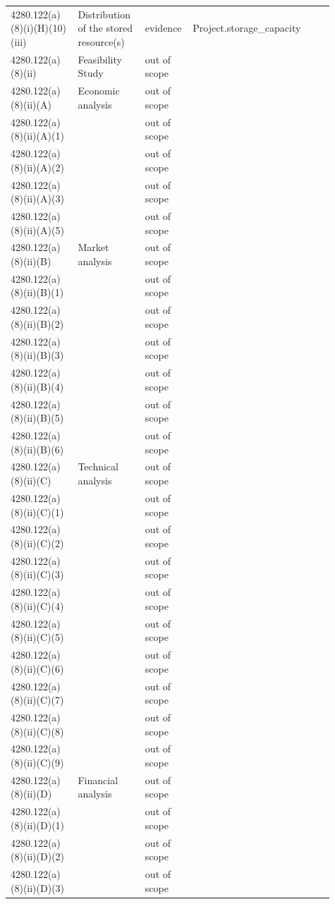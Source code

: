 \begin{longtable}{p{0.2\linewidth}p{0.2\linewidth}p{0.09\linewidth}p{0.42\linewidth}}
4280.122(a)(8)(i)(H)(10)(iii) & Distribution of the stored resource(s) & evidence & Project.storage\_capacity \\
4280.122(a)(8)(ii) & Feasibility Study & out of scope &  \\
4280.122(a)(8)(ii)(A) & Economic analysis & out of scope &  \\
4280.122(a)(8)(ii)(A)(1) &  & out of scope &  \\
4280.122(a)(8)(ii)(A)(2) &  & out of scope &  \\
4280.122(a)(8)(ii)(A)(3) &  & out of scope &  \\
4280.122(a)(8)(ii)(A)(5) &  & out of scope &  \\
4280.122(a)(8)(ii)(B) & Market analysis & out of scope &  \\
4280.122(a)(8)(ii)(B)(1) &  & out of scope &  \\
4280.122(a)(8)(ii)(B)(2) &  & out of scope &  \\
4280.122(a)(8)(ii)(B)(3) &  & out of scope &  \\
4280.122(a)(8)(ii)(B)(4) &  & out of scope &  \\
4280.122(a)(8)(ii)(B)(5) &  & out of scope &  \\
4280.122(a)(8)(ii)(B)(6) &  & out of scope &  \\
4280.122(a)(8)(ii)(C) & Technical analysis & out of scope &  \\
4280.122(a)(8)(ii)(C)(1) &  & out of scope &  \\
4280.122(a)(8)(ii)(C)(2) &  & out of scope &  \\
4280.122(a)(8)(ii)(C)(3) &  & out of scope &  \\
4280.122(a)(8)(ii)(C)(4) &  & out of scope &  \\
4280.122(a)(8)(ii)(C)(5) &  & out of scope &  \\
4280.122(a)(8)(ii)(C)(6) &  & out of scope &  \\
4280.122(a)(8)(ii)(C)(7) &  & out of scope &  \\
4280.122(a)(8)(ii)(C)(8) &  & out of scope &  \\
4280.122(a)(8)(ii)(C)(9) &  & out of scope &  \\
4280.122(a)(8)(ii)(D) & Financial analysis & out of scope &  \\
4280.122(a)(8)(ii)(D)(1) &  & out of scope &  \\
4280.122(a)(8)(ii)(D)(2) &  & out of scope &  \\
4280.122(a)(8)(ii)(D)(3) &  & out of scope &  \\

\end{longtable}
